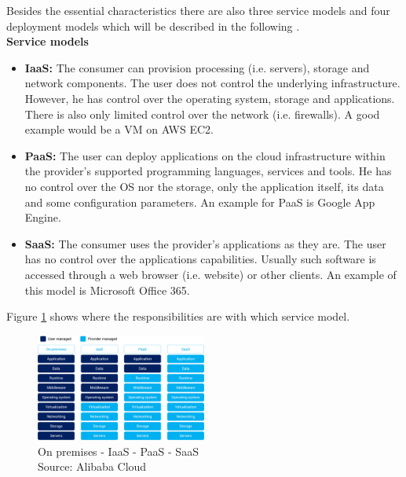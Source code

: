 Besides the essential characteristics there are also three service models and four deployment models which will be described in the following \cite{Mell:2011:SND:2206223, IBMCC}.\\
\newline
\textbf{Service models}
\begin{itemize}
    \item \textbf{\gls{IaaS}:} The consumer can provision processing (i.e. servers), storage and network components. The user does not control the underlying infrastructure. However, he has control over the operating system, storage and applications. There is also only limited control over the network (i.e. firewalls). A good example would be a \gls{VM} on \gls{AWS} \gls{EC2}.
    \item \textbf{\gls{PaaS}:} The user can deploy applications on the cloud infrastructure within the provider's supported programming languages, services and tools. He has no control over the \gls{OS} nor the storage, only the application itself, its data and some configuration parameters. An example for \gls{PaaS} is Google App Engine.
    \item \textbf{\gls{SaaS}:} The consumer uses the provider's applications as they are. The user has no control over the applications capabilities. Usually such software is accessed through a web browser (i.e. website) or other clients. An example of this model is Microsoft Office 365.
\end{itemize}
Figure \ref{fig:iaas} shows where the responsibilities are with which service model.

\begin{figure}[htp]
\begin{center}
\includegraphics[width=0.5\textwidth]{bilder/iaas.png}
\captionsetup[table]{justification=centering, labelfont=bf}
\caption[On premises - IaaS - PaaS - SaaS]{On premises - IaaS - PaaS - SaaS\\Source: Alibaba Cloud \cite{alibaba}}
\label{fig:iaas}
\end{center}
\end{figure}

